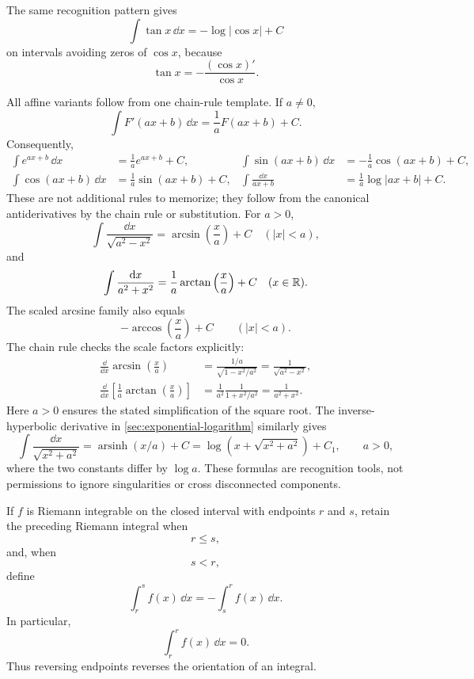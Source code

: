 \begin{example}
The same recognition pattern gives
\[
\boxed{\int\tan x\,\dd x=-\log|\cos x|+C}
\]
on intervals avoiding zeros of \(\cos x\), because
\[
\tan x=-\frac{(\cos x)'}{\cos x}.
\]

All affine variants follow from one chain-rule template. If \(a\ne0\),
\[
\int F'(ax+b)\,\dd x=\frac1aF(ax+b)+C.
\]
Consequently,
\[
\begin{aligned}
\int e^{ax+b}\,\dd x&=\frac1a e^{ax+b}+C,&
\int\sin(ax+b)\,\dd x&=-\frac1a\cos(ax+b)+C,\\
\int\cos(ax+b)\,\dd x&=\frac1a\sin(ax+b)+C,&
\int\frac{\dd x}{ax+b}&=\frac1a\log|ax+b|+C.
\end{aligned}
\]
These are not additional rules to memorize; they follow from the canonical
antiderivatives by the chain rule or substitution.
For \(a>0\),
\[
\int\frac{\dd x}{\sqrt{a^2-x^2}}
=\arcsin\left(\frac xa\right)+C
\quad(|x|<a),
\]
and
\[
\int\frac{\mathop{}\!\mathrm{d} x}{a^2+x^2}
=\frac1a\arctan\left(\frac xa\right)+C
\quad(x\in\mathbb{R}).
\]
The scaled arcsine family also equals
\[
-\arccos\left(\frac xa\right)+C\qquad(|x|<a).
\]
The chain rule checks the scale factors explicitly:
\[
\begin{aligned}
\frac{\dd}{\dd x}\arcsin\left(\frac xa\right)
 &=\frac{1/a}{\sqrt{1-x^2/a^2}}
 =\frac1{\sqrt{a^2-x^2}},\\
\frac{\dd}{\dd x}\left[\frac1a\arctan\left(\frac xa\right)\right]
 &=\frac1{a^2}\frac1{1+x^2/a^2}=\frac1{a^2+x^2}.
\end{aligned}
\]
Here $a>0$ ensures the stated simplification of the square root.
The inverse-hyperbolic derivative in
\cref{sec:exponential-logarithm} similarly gives
\[
\int\frac{\dd x}{\sqrt{x^2+a^2}}
=\operatorname{arsinh}(x/a)+C
=\log\!\left(x+\sqrt{x^2+a^2}\right)+C_1,
\qquad a>0,
\]
where the two constants differ by \(\log a\).
These formulas are recognition tools, not permissions to ignore singularities
or cross disconnected components.
\end{example}

\begin{definition}
\label{def:oriented-interval-integral}
If \(f\) is Riemann integrable on the closed interval with endpoints \(r\)
and \(s\), retain the preceding Riemann integral when
\[
r\leq s,
\]
and, when
\[
s<r,
\]
define
\[
\int_r^s f(x)\,\dd x
=
-\int_s^r f(x)\,\dd x.
\]
In particular,
\[
\int_r^r f(x)\,\dd x=0.
\]
Thus reversing endpoints reverses the orientation of an integral.
\end{definition}

